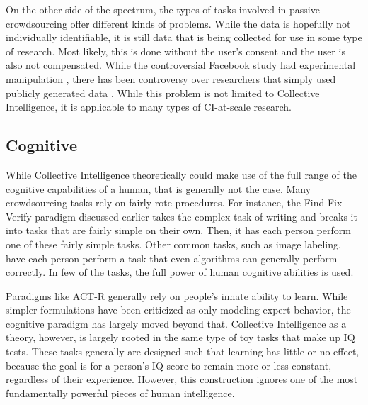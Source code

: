 On the other side of the spectrum, the types of tasks involved in passive crowdsourcing offer different kinds of problems. While the data is hopefully not individually identifiable, it is still data that is being collected for use in some type of research. Most likely, this is done without the user's consent and the user is also not compensated. While the controversial Facebook study had experimental manipulation \cite{facebook1}, there has been controversy over researchers that simply used publicly generated data \cite{facebook2}. While this problem is not limited to Collective Intelligence, it is applicable to many types of CI-at-scale research.  

\subsection{Cognitive}

While Collective Intelligence theoretically could make use of the full range of the cognitive capabilities of a human, that is generally not the case. Many crowdsourcing tasks rely on fairly rote procedures. For instance, the Find-Fix-Verify paradigm discussed earlier takes the complex task of writing and breaks it into tasks that are fairly simple on their own. Then, it has each person perform one of these fairly simple tasks. Other common tasks, such as image labeling, have each person perform a task that even algorithms can generally perform correctly. In few of the tasks, the full power of human cognitive abilities is used.

Paradigms like ACT-R \cite{actr} generally rely on people's innate ability to learn. While simpler formulations have been criticized as only modeling expert behavior, the cognitive paradigm has largely moved beyond that. Collective Intelligence as a theory, however, is largely rooted in the same type of toy tasks that make up IQ tests. These tasks generally are designed such that learning has little or no effect, because the goal is for a person's IQ score to remain more or less constant, regardless of their experience. However, this construction ignores one of the most fundamentally powerful pieces of human intelligence. 